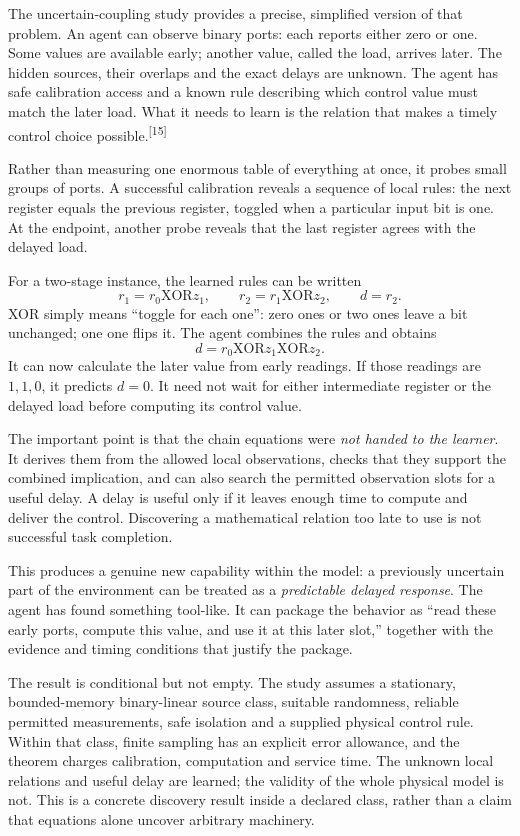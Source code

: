 \documentclass[11pt]{article}
\newcommand{\sn}[1]{\textsuperscript{[#1]}}
\begin{document}
The uncertain-coupling study provides a precise, simplified version of that problem. An agent can observe binary ports: each reports either zero or one. Some values are available early; another value, called the load, arrives later. The hidden sources, their overlaps and the exact delays are unknown. The agent has safe calibration access and a known rule describing which control value must match the later load. What it needs to learn is the relation that makes a timely control choice possible.\sn{15}

Rather than measuring one enormous table of everything at once, it probes small groups of ports. A successful calibration reveals a sequence of local rules: the next register equals the previous register, toggled when a particular input bit is one. At the endpoint, another probe reveals that the last register agrees with the delayed load.

For a two-stage instance, the learned rules can be written
\[
 r_1=r_0\mathbin{\mathrm{XOR}}z_1,\qquad
 r_2=r_1\mathbin{\mathrm{XOR}}z_2,\qquad d=r_2.
\]
XOR simply means ``toggle for each one'': zero ones or two ones leave a bit unchanged; one one flips it. The agent combines the rules and obtains
\[
 d=r_0\mathbin{\mathrm{XOR}}z_1\mathbin{\mathrm{XOR}}z_2.
\]
It can now calculate the later value from early readings. If those readings are $1,1,0$, it predicts $d=0$. It need not wait for either intermediate register or the delayed load before computing its control value.

The important point is that the chain equations were \emph{not handed to the learner}. It derives them from the allowed local observations, checks that they support the combined implication, and can also search the permitted observation slots for a useful delay. A delay is useful only if it leaves enough time to compute and deliver the control. Discovering a mathematical relation too late to use is not successful task completion.

This produces a genuine new capability within the model: a previously uncertain part of the environment can be treated as a \emph{predictable delayed response}. The agent has found something tool-like. It can package the behavior as ``read these early ports, compute this value, and use it at this later slot,'' together with the evidence and timing conditions that justify the package.

The result is conditional but not empty. The study assumes a stationary, bounded-memory binary-linear source class, suitable randomness, reliable permitted measurements, safe isolation and a supplied physical control rule. Within that class, finite sampling has an explicit error allowance, and the theorem charges calibration, computation and service time. The unknown local relations and useful delay are learned; the validity of the whole physical model is not. This is a concrete discovery result inside a declared class, rather than a claim that equations alone uncover arbitrary machinery.
\end{document}
